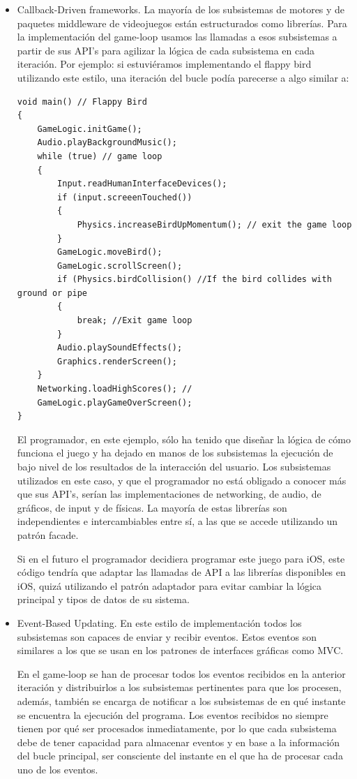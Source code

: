 \documentclass[a4paper,12pt]{report}
\begin{document}
	\begin{itemize}
		\item Callback-Driven frameworks. La mayoría de los subsistemas de motores y de paquetes middleware de videojuegos están estructurados como librerías. Para la implementación del game-loop usamos las llamadas a esos subsistemas a partir de sus API's para agilizar la lógica de cada subsistema en cada iteración. Por ejemplo: si estuviéramos implementando el flappy bird utilizando este estilo, una iteración del bucle podía parecerse a algo similar a:
		
		\begin{lstlisting}[style=C, numbers=none]
void main() // Flappy Bird
{
	GameLogic.initGame();
	Audio.playBackgroundMusic();
	while (true) // game loop
	{
		Input.readHumanInterfaceDevices();
		if (input.screeenTouched())
		{
			Physics.increaseBirdUpMomentum(); // exit the game loop
		}
		GameLogic.moveBird();
		GameLogic.scrollScreen();
		if (Physics.birdCollision() //If the bird collides with ground or pipe
		{
			break; //Exit game loop
		}
		Audio.playSoundEffects();
		Graphics.renderScreen();
	}
	Networking.loadHighScores(); //
	GameLogic.playGameOverScreen();
}
		\end{lstlisting}
		
		
		El programador, en este ejemplo, sólo ha tenido que diseñar la lógica de cómo funciona el juego y ha dejado en manos de los subsistemas la ejecución de bajo nivel de los resultados de la interacción del usuario. Los subsistemas utilizados en este caso, y que el programador no está obligado a conocer más que sus API's, serían las implementaciones de networking, de audio, de gráficos, de input y de físicas. La mayoría de estas librerías son independientes e intercambiables entre sí, a las que se accede utilizando un patrón facade.
		
		Si en el futuro el programador decidiera programar este juego para iOS, este código tendría que adaptar las llamadas de API a las librerías disponibles en iOS, quizá utilizando el patrón adaptador para evitar cambiar la lógica principal y tipos de datos de su sistema.	
		
		\item Event-Based Updating. En este estilo de implementación todos los subsistemas son capaces de enviar y recibir eventos. Estos eventos son similares a los que se usan en los patrones de interfaces gráficas como MVC. 
		
		En el game-loop se han de procesar todos los eventos recibidos en la anterior iteración y distribuirlos a los subsistemas pertinentes para que los procesen, además, también se encarga de notificar a los subsistemas de en qué instante se encuentra la ejecución del programa. Los eventos recibidos no siempre tienen por qué ser procesados inmediatamente, por lo que cada subsistema debe de tener capacidad para almacenar eventos y en base a la información del bucle principal, ser consciente del instante en el que ha de procesar cada uno de los eventos. 
		

\end{itemize}
\end{document}
